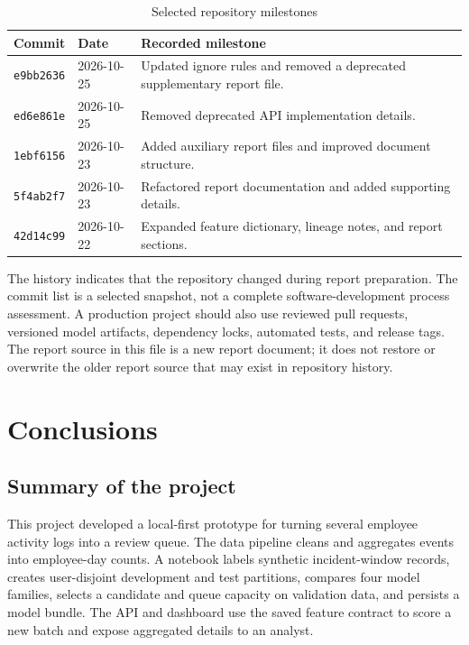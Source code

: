 \documentclass[12pt,a4paper,oneside]{report}
\newcommand{\tablefont}{\small}
\newcommand{\code}[1]{\texttt{\small #1}}
\begin{document}
\begin{table}[H]
\centering
\tablefont
\caption{Selected repository milestones}
\label{tab:git-history}
\begin{tabularx}{\textwidth}{|p{}|p{}|Y|}
\hline
\textbf{Commit} & \textbf{Date} & \textbf{Recorded milestone}\\\hline
\code{e9bb2636} & 2026-10-25 & Updated ignore rules and removed a deprecated supplementary report file.\\\hline
\code{ed6e861e} & 2026-10-25 & Removed deprecated API implementation details.\\\hline
\code{1ebf6156} & 2026-10-23 & Added auxiliary report files and improved document structure.\\\hline
\code{5f4ab2f7} & 2026-10-23 & Refactored report documentation and added supporting details.\\\hline
\code{42d14c99} & 2026-10-22 & Expanded feature dictionary, lineage notes, and report sections.\\\hline
\end{tabularx}
\end{table}

The history indicates that the repository changed during report
preparation. The commit list is a selected snapshot, not a complete
software-development process assessment. A production project should
also use reviewed pull requests, versioned model artifacts, dependency
locks, automated tests, and release tags. The report source in this
file is a new report document; it does not restore or overwrite the
older report source that may exist in repository history.

\chapter{Conclusions}
\label{chap:conclusion}

\section{Summary of the project}
This project developed a local-first prototype for turning several
employee activity logs into a review queue. The data pipeline cleans
and aggregates events into employee-day counts. A notebook labels
synthetic incident-window records, creates user-disjoint development
and test partitions, compares four model families, selects a candidate
and queue capacity on validation data, and persists a model bundle.
The API and dashboard use the saved feature contract to score a new
batch and expose aggregated details to an analyst.
\end{document}

